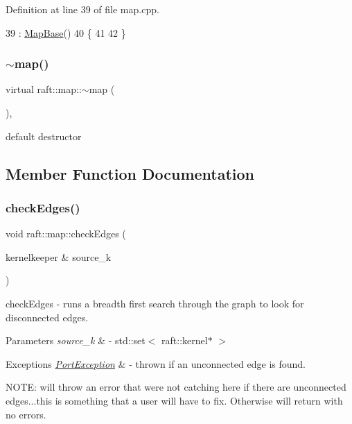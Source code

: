 Definition at line 39 of file map.\+cpp.


\begin{DoxyCode}
39              : \hyperlink{class_map_base_a5a923d5b3ececb0407aa934d967ab7b1}{MapBase}()
40 \{
41 
42 \}
\end{DoxyCode}
\hypertarget{classraft_1_1map_a9a8bdcfb92f7891f9f5fd981eb1227b6}{}\label{classraft_1_1map_a9a8bdcfb92f7891f9f5fd981eb1227b6} 
\subsubsection{\texorpdfstring{$\sim$map()}{~map()}}
{\footnotesize\ttfamily virtual raft\+::map\+::$\sim$map (\begin{DoxyParamCaption}{ }\end{DoxyParamCaption})\hspace{0.3cm}{\ttfamily [virtual]}, {\ttfamily [default]}}

default destructor 

\subsection{Member Function Documentation}
\hypertarget{classraft_1_1map_aad8ce35fdb536b14db16b3462157dcd7}{}\label{classraft_1_1map_aad8ce35fdb536b14db16b3462157dcd7} 
\subsubsection{\texorpdfstring{check\+Edges()}{checkEdges()}}
{\footnotesize\ttfamily void raft\+::map\+::check\+Edges (\begin{DoxyParamCaption}\item[{kernelkeeper \&}]{source\+\_\+k }\end{DoxyParamCaption})\hspace{0.3cm}{\ttfamily [protected]}}

check\+Edges -\/ runs a breadth first search through the graph to look for disconnected edges. 
\begin{DoxyParams}{Parameters}
{\em source\+\_\+k} & -\/ std\+::set$<$ raft\+::kernel$\ast$ $>$ \\
\hline
\end{DoxyParams}

\begin{DoxyExceptions}{Exceptions}
{\em \hyperlink{class_port_exception}{Port\+Exception}} & -\/ thrown if an unconnected edge is found. \\
\hline
\end{DoxyExceptions}
N\+O\+TE\+: will throw an error that we\textquotesingle{}re not catching here if there are unconnected edges...this is something that a user will have to fix. Otherwise will return with no errors.

